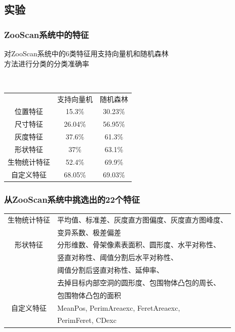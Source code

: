 \documentclass[notheorems,mathserif,table,compress]{beamer}  %
\begin{document}
\subsection{实验}
\begin{frame}
\frametitle{ZooScan系统中的特征}
\centering
{\color{blue}对ZooScan系统中的6类特征用支持向量机和随机森林\protect\\方法进行分类的分类准确率}

~\newline
{}
\begin{tabular}[c]{c|c|c}
& 支持向量机 & 随机森林 \\
位置特征 & 15.3\% & 30.23\% \\
尺寸特征 & 26.04\% & 56.95\% \\
灰度特征 & 37.6\% & 61.3\% \\
形状特征 & 37\% & 63.1\% \\
生物统计特征 & 52.4\% & 69.9\% \\ 
自定义特征 & 68.05\% & 69.03\% \\
\end{tabular}
\end{frame}
\begin{frame}
\frametitle{从ZooScan系统中挑选出的22个特征}
\centering
{}
\begin{tabular}{c|l}
生物统计特征 & 平均值、标准差、灰度直方图偏度、灰度直方图峰度、\\
 & 变异系数、极差偏差 \\
\hline
形状特征 & 分形维数、骨架像素表面积、圆形度、水平对称性、\\
 & 竖直对称性、阈值分割后水平对称性、\\
 & 阈值分割后竖直对称性、延伸率、\\
  & 去掉目标内部空洞的圆形度、包围物体凸包的周长、\\
 & 包围物体凸包的面积\\ 
 \hline
自定义特征 & MeanPos, PerimAreaexc, FeretAreaexc, \\
 & PerimFeret, CDexc \\
\end{tabular}
\end{frame}
\end{document}
